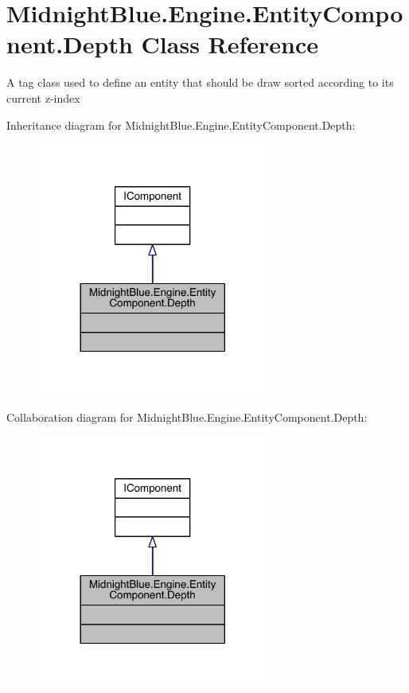 \hypertarget{class_midnight_blue_1_1_engine_1_1_entity_component_1_1_depth}{}\section{Midnight\+Blue.\+Engine.\+Entity\+Component.\+Depth Class Reference}
\label{class_midnight_blue_1_1_engine_1_1_entity_component_1_1_depth}


A tag class used to define an entity that should be draw sorted according to its current z-\/index  




Inheritance diagram for Midnight\+Blue.\+Engine.\+Entity\+Component.\+Depth\+:
\nopagebreak
\begin{figure}[H]
\begin{center}
\leavevmode
\includegraphics[width=216pt]{class_midnight_blue_1_1_engine_1_1_entity_component_1_1_depth__inherit__graph}
\end{center}
\end{figure}


Collaboration diagram for Midnight\+Blue.\+Engine.\+Entity\+Component.\+Depth\+:
\nopagebreak
\begin{figure}[H]
\begin{center}
\leavevmode
\includegraphics[width=216pt]{class_midnight_blue_1_1_engine_1_1_entity_component_1_1_depth__coll__graph}
\end{center}
\end{figure}


